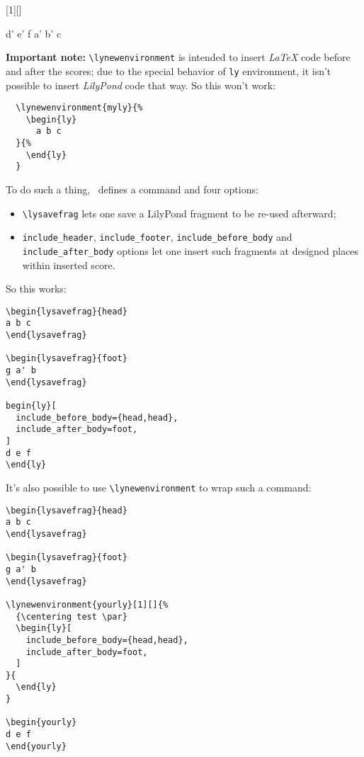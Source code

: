 \documentclass{lyluatexexample}
\begin{document}
[1][]{%
\edef\option{#1}
\figure
\center
  \ly
}{%
  \endly%
  \def\empty{}\ifx\option\empty\else\caption{\option}\fi
\endcenter
\endfigure
}

\begin{lyotherfigure}
d' e' f
a' b' c
\end{lyotherfigure}

\textbf{Important note:} \verb`\lynewenvironment` is intended to insert \emph{LaTeX} code before
and after the scores; due to the special behavior of \verb`ly` environment, it isn't possible
to insert \emph{LilyPond} code that way. So this won't work:

\begin{verbatim}
  \lynewenvironment{myly}{%
    \begin{ly}
      a b c
  }{%
    \end{ly}
  }
\end{verbatim}

To do such a thing, \lyluatex\ defines a command and four options:
\begin{itemize}
  \item \verb`\lysavefrag` lets one save a LilyPond fragment to be re-used afterward;
  \item \verb`include_header`, \verb`include_footer`, \verb`include_before_body` and \verb`include_after_body` options
        let one insert such fragments at designed places within inserted score.
\end{itemize}

So this works:

\begin{verbatim}
\begin{lysavefrag}{head}
a b c
\end{lysavefrag}

\begin{lysavefrag}{foot}
g a' b
\end{lysavefrag}

begin{ly}[
  include_before_body={head,head},
  include_after_body=foot,
]
d e f
\end{ly}
\end{verbatim}

It's also possible to use \verb`\lynewenvironment` to wrap such a command:

\begin{verbatim}
\begin{lysavefrag}{head}
a b c
\end{lysavefrag}

\begin{lysavefrag}{foot}
g a' b
\end{lysavefrag}
  
\lynewenvironment{yourly}[1][]{%
  {\centering test \par}
  \begin{ly}[
    include_before_body={head,head},
    include_after_body=foot,
  ]
}{
  \end{ly}
}

\begin{yourly}
d e f
\end{yourly}
\end{verbatim}
\end{document}
